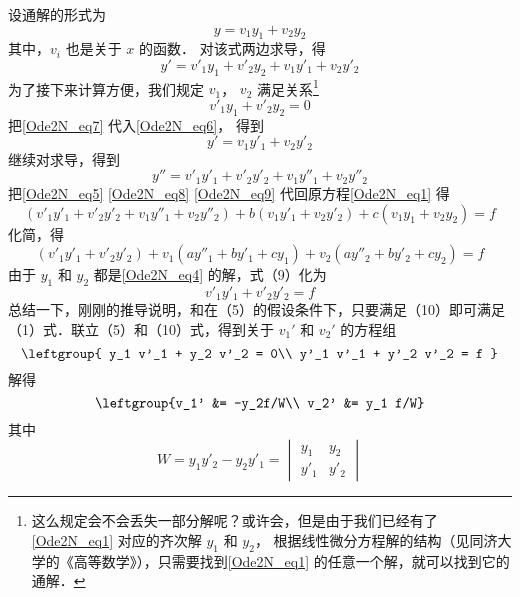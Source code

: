 设通解的形式为
\begin{equation}\label{Ode2N_eq5}
y = v_1 y_1 + v_2 y_2
\end{equation}
其中，$v_i$ 也是关于 $x$ 的函数． 对该式两边求导，得
\begin{equation}\label{Ode2N_eq6}
y' = v'_1 y_1 + v'_2 y_2 + v_1 y'_1 + v_2 y'_2
\end{equation}
为了接下来计算方便，我们规定 $v_1$， $v_2$ 满足关系\footnote{这么规定会不会丢失一部分解呢？或许会，但是由于我们已经有了\autoref{Ode2N_eq1} 对应的齐次解 $y_1$ 和 $y_2$， 根据线性微分方程解的结构（见同济大学的《高等数学》），只需要找到\autoref{Ode2N_eq1} 的任意一个解，就可以找到它的通解．}
\begin{equation}\label{Ode2N_eq7}
v'_1 y_1 + v'_2 y_2 = 0
\end{equation}
把\autoref{Ode2N_eq7} 代入\autoref{Ode2N_eq6}， 得到
\begin{equation}\label{Ode2N_eq8}
y' = v_1 y'_1 + v_2 y'_2
\end{equation}
继续对求导，得到
\begin{equation}\label{Ode2N_eq9}
y'' = v'_1 y'_1 + v'_2 y'_2 + v_1 y''_1 + v_2 y''_2
\end{equation}
把\autoref{Ode2N_eq5} \autoref{Ode2N_eq8} \autoref{Ode2N_eq9} 代回原方程\autoref{Ode2N_eq1} 得
\begin{equation}
(v'_1 y'_1 + v'_2 y'_2 + v_1 y''_1 + v_2 y''_2) + b (v_1 y'_1 + v_2 y'_2) + c(v_1 y_1 + v_2 y_2) = f
\end{equation}
化简，得
\begin{equation}
(v'_1 y'_1 + v'_2 y'_2) + v_1 (a y''_1 + b y'_1 + c y_1) + v_2 (a y''_2 + b y'_2 + c y_2) = f \end{equation}
由于 $y_1$ 和 $y_2$ 都是\autoref{Ode2N_eq4} 的解，式（9）化为 %
\begin{equation} v'_1 y'_1 + v'_2 y'_2 = f
\end{equation}
总结一下，刚刚的推导说明，和在（5）的假设条件下，只要满足（10）即可满足（1）式．联立（5）和（10）式，得到关于 $v_1'$ 和 $v_2'$ 的方程组
\begin{equation}
\leftgroup{
y_1 v'_1 + y_2 v'_2 = 0\\
y'_1 v'_1 + y'_2 v'_2 = f
}\end{equation}
解得
\begin{equation}
\leftgroup{v_1' &= -y_2f/W\\
v_2' &= y_1 f/W}
\end{equation}
其中
\begin{equation}
W = y_1 y'_2 - y_2 y'_1 = 
\begin{vmatrix}
y_1 & y_2\\
y'_1 & y'_2
\end{vmatrix}
\end{equation}
